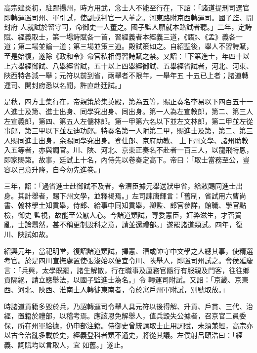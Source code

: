 
\begin{pinyinscope}

 高宗建炎初，駐蹕揚州，時方用武，念士人不能至行在，下詔：「諸道提刑司選官即轉運置司州、軍引試，使副或判官一人董之。河東路附京西轉運司。國子監、開封府
 人就試於留守司，命御史一人董之。國子監人願就本路試者聽。」二年，定詩賦、經義取士，第一場詩賦各一首，習經義者本經義三道，《語》、《孟》義各一道；第二場並論一道；第三場並策三道。殿試策如之。自紹聖後，舉人不習詩賦，至是始復，遂除《政和令》命官私相傳習詩賦之禁。又詔：「下第進士，年四十以上六舉經御試、八舉經省試，五十以上四舉經御試、五舉經省試者，河北、河東、陜西特各減一舉；元符以前到省，兩舉者不限年，一舉年五
 十五已上者；諸道轉運司、開封府悉以名聞，許直赴廷試。」



 是秋，四方士集行在，帝親策於集英殿，第為五等，賜正奏名李易以下四百五十一人進士及第、進士出身、同學究出身、同出身。第一人為左宣教郎，第二、第三人左宣義郎，第四、第五人左儒林郎。第一甲第六名以下並左文林郎，第二甲並左從事郎，第三甲以下並左迪功郎。特奏名第一人附第二甲，賜進士及第，第二、第三人賜同進士出身，余賜同學究出身。登仕郎、京府助教、
 上下州文學、諸州助教入五等者，亦與調官。川、陜、河北、京東正奏名不赴者一百三人，以龍飛特恩，即家賜第。故事，廷試上十名，內侍先以卷奏定高下。帝曰：「取士當務至公，豈容以己意升降，自今勿先進卷。」



 三年，詔：「過省進士赴御試不及者，令漕臣據元舉送狀申省，給敕賜同進士出身。其計舉者，賜下州文學，並釋褐焉。」左司諫唐輝言：「舊制，省試用六曹尚書、翰林學士知貢舉，侍郎、給事中同知貢舉，卿監、郎官參詳，館職、學官點檢，御史
 監視，故能至公厭人心。今諸道類試，專委憲臣，奸弊滋生，才否貿亂，士論囂然，甚不稱更制設科之意，請並還禮部。」遂罷諸道類試。四年，復川、陜試如故。



 紹興元年，當祀明堂，復詔諸道類試，擇憲、漕或帥守中文學之人總其事，使精選考官。於是四川宣撫處置使張浚始以便宜令川、陜舉人，即置司州試之。會侯延慶言：「兵興，太學既罷，諸生解散，行在職事及厘務官隨行有服親及門客，往往鄉貢隔絕，請立應舉法，以國子監進士為名。」令
 轉運司附試。又詔：「京畿、京東西、河北、陜西、淮南士人轉徙東南者，令於寓戶州軍附試，別號取放。」



 時諸道貢籍多毀於兵，乃詔轉運司令舉人具元符以後得解、升貢、戶貫、三代、治經，置籍於禮部，以稽考焉。應該恩免解舉人，值兵毀失公據者，召京官二員委保，所在州軍給據，仍申部注籍。侍御史曾統請取士止用詞賦，未須兼經，高宗亦以古今治亂多載於史，經義登科者類不通史，將從其議。左僕射呂頤浩曰：「經義、詞賦均以言取人，宜
 如舊。」遂止。




\end{pinyinscope}
